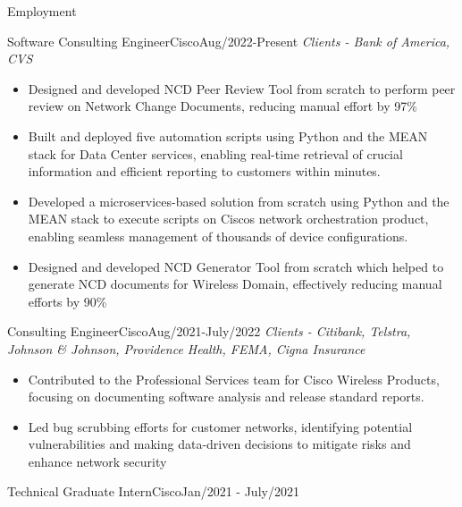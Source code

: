 \documentclass[]{mcdowellcv}
\begin{document}
    \begin{cvsection}{Employment}

        \begin{cvsubsection}{Software Consulting Engineer}{Cisco}{\normalfont Aug/2022-Present}
            \textit{Clients - Bank of America, CVS} \vspace{-0.2em}
            \begin{itemize}
                \item Designed and developed NCD Peer Review Tool from scratch to perform peer review on Network Change Documents, reducing manual effort by 97\%
                \item Built and deployed five automation scripts using Python and the MEAN stack for Data Center services, enabling real-time retrieval of crucial information and efficient reporting to customers within minutes.
                \item Developed a microservices-based solution from scratch using Python and the MEAN stack to execute scripts on Cisco\textquotesingle{}s network orchestration product, enabling seamless management of thousands of device configurations.
                \item Designed and developed NCD Generator Tool from scratch which helped to generate NCD documents for Wireless Domain, effectively reducing manual efforts by 90\%
            \end{itemize}
        \end{cvsubsection}
        \begin{cvsubsection}{Consulting Engineer}{Cisco}{\normalfont Aug/2021-July/2022}
            \textit{Clients - Citibank, Telstra, Johnson \& Johnson, Providence Health, FEMA, Cigna Insurance} \vspace{-0.2em}
            \begin{itemize}
                \item Contributed to the Professional Services team for Cisco Wireless Products, focusing on documenting software analysis and release standard reports.
			    \item Led bug scrubbing efforts for customer networks, identifying potential vulnerabilities and making data-driven decisions to mitigate risks and enhance network security
		    \end{itemize}
        \end{cvsubsection}
%
        \begin{cvsubsection}{Technical Graduate Intern}{Cisco}{\normalfont Jan/2021 - July/2021}

\end{cvsubsection}
\end{cvsection}
\end{document}
